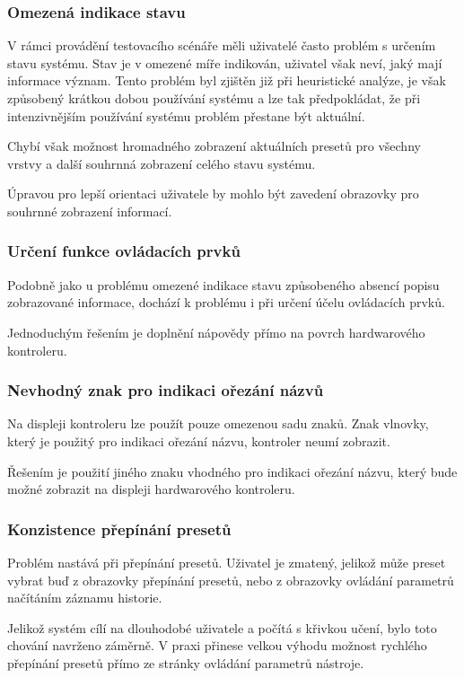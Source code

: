 \documentclass[thesis=M,czech]{FITthesis}[2019/03/06]
\begin{document}
			\subsubsection{Omezená indikace stavu}
				V rámci provádění testovacího scénáře měli uživatelé často problém s určením stavu systému. Stav je v omezené míře indikován, uživatel však neví, jaký mají informace význam. Tento problém byl zjištěn již při heuristické analýze, je však způsobený krátkou dobou používání systému a lze tak předpokládat, že při intenzivnějším používání systému problém přestane být aktuální.
				
				Chybí však možnost hromadného zobrazení aktuálních presetů pro všechny vrstvy a další souhrnná zobrazení celého stavu systému.
				
				Úpravou pro lepší orientaci uživatele by mohlo být zavedení obrazovky pro souhrnné zobrazení  informací.
				
			\subsubsection{Určení funkce ovládacích prvků}
				Podobně jako u problému omezené indikace stavu způsobeného absencí popisu zobrazované informace, dochází k problému i při určení účelu ovládacích prvků.
				
				Jednoduchým řešením je doplnění nápovědy přímo na povrch hardwarového kontroleru.
			
			\subsubsection{Nevhodný znak pro indikaci ořezání názvů}
				Na displeji kontroleru lze použít pouze omezenou sadu znaků. Znak vlnovky, který je použitý pro indikaci ořezání názvu, kontroler neumí zobrazit. 
				
				Řešením je použití jiného znaku vhodného pro indikaci ořezání názvu, který bude možné zobrazit na displeji hardwarového kontroleru.
				
			\subsubsection{Konzistence přepínání presetů}
				Problém nastává při přepínání presetů. Uživatel je zmatený, jelikož může preset vybrat buď z obrazovky přepínání presetů, nebo z obrazovky ovládání parametrů načítáním záznamu historie.
				
				Jelikož systém cílí na dlouhodobé uživatele a počítá s křivkou učení, bylo toto chování navrženo záměrně. V praxi přinese velkou výhodu možnost rychlého přepínání presetů přímo ze stránky ovládání parametrů nástroje.
				
\end{document}

